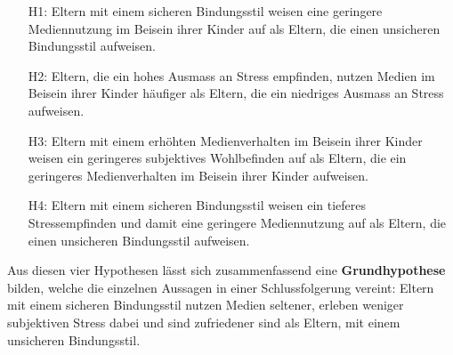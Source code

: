 \begin{itemize}
  \item[H1:] Eltern mit einem sicheren Bindungsstil weisen eine geringere Mediennutzung im Beisein ihrer Kinder auf als Eltern, die einen unsicheren Bindungsstil aufweisen.
  \item[H2:] Eltern, die ein hohes Ausmass an Stress empfinden, nutzen Medien im Beisein ihrer Kinder häufiger als Eltern, die ein niedriges Ausmass an Stress aufweisen.
  \item [H3:] Eltern mit einem erhöhten Medienverhalten im Beisein ihrer Kinder weisen ein geringeres subjektives Wohlbefinden auf als Eltern, die ein geringeres Medienverhalten im Beisein ihrer Kinder aufweisen.
  \item [H4:] Eltern mit einem sicheren Bindungsstil weisen ein tieferes Stressempfinden und damit eine geringere Mediennutzung auf als Eltern, die einen unsicheren Bindungsstil aufweisen.
\end{itemize}

Aus diesen vier Hypothesen lässt sich zusammenfassend eine \textbf{Grundhypothese} bilden, welche die einzelnen Aussagen in einer Schlussfolgerung vereint: Eltern mit einem sicheren Bindungsstil nutzen Medien seltener, erleben weniger subjektiven Stress dabei und sind zufriedener sind als Eltern, mit einem unsicheren Bindungsstil.